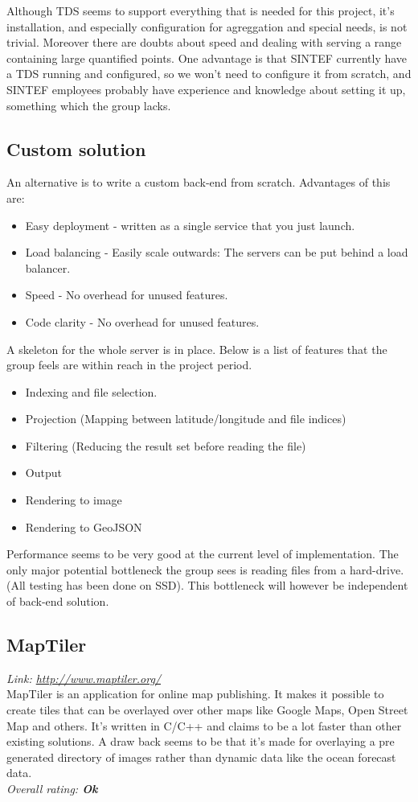 \documentclass[11pt,a4paper,titlepage,oneside]{report}
\begin{document}
  Although \gls{TDS} seems to support everything that is needed for this project, it's installation, and especially configuration for agreggation and special needs, is not trivial. Moreover there are doubts about speed and dealing with serving a range containing large quantified points. One advantage is that SINTEF currently have a \gls{TDS} running and configured, so we won't need to configure it from scratch, and SINTEF employees probably have experience and knowledge about setting it up, something which the group lacks.

  \subsection{Custom solution}
  An alternative is to write a custom \gls{back-end} from scratch.
  Advantages of this are:
  \begin{itemize}
  \item Easy deployment - written as a single service that you just launch.
  \item Load balancing - Easily scale outwards: The servers can be put behind a load balancer. 
  \item Speed - No overhead for unused features.
  \item Code clarity - No overhead for unused features.
  \end{itemize}
  A skeleton for the whole server is in place. Below is a list of features that the group feels are within reach in the project period. 
  \begin{itemize}
  \item Indexing and file selection.
  \item Projection (Mapping between latitude/longitude and file indices)
  \item Filtering (Reducing the result set before reading the file)
  \item Output
  \item Rendering to image
  \item Rendering to GeoJSON
  \end{itemize}

  Performance seems to be very good at the current level of implementation. The only major potential bottleneck the group sees is reading files from a hard-drive. (All testing has been done on \gls{SSD}). This bottleneck will however be independent of \gls{back-end} solution.
  
  \subsection{MapTiler}
  \emph{Link: \url{http://www.maptiler.org/}} \\%
    MapTiler is an application for online map publishing. It makes it possible to create tiles that can be overlayed over other maps like Google Maps, Open Street Map and others. It's written in C/C++ and claims to be a lot faster than other existing solutions. A draw back seems to be that it's made for overlaying a pre generated directory of images rather than dynamic data like the ocean forecast data.
  \\ \emph{Overall rating: \textbf{Ok}}
  
\end{document}
